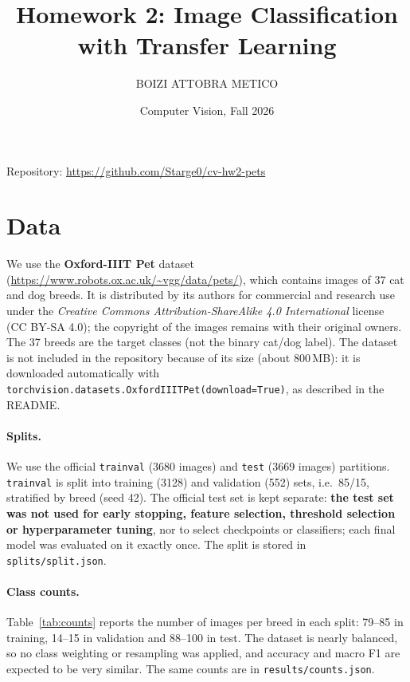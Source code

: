 \documentclass[11pt,a4paper]{article}
\title{Homework 2: Image Classification with Transfer Learning}
\author{BOIZI ATTOBRA METICO}
\date{Computer Vision, Fall 2026}
\begin{document}
\maketitle

Repository: \url{https://github.com/Starge0/cv-hw2-pets}

\section{Data}

We use the \textbf{Oxford-IIIT Pet} dataset \cite{parkhi2012}
(\url{https://www.robots.ox.ac.uk/~vgg/data/pets/}), which contains images of 37 cat and dog
breeds. It is distributed by its authors for commercial and research use under the
\emph{Creative Commons Attribution-ShareAlike 4.0 International} license (CC BY-SA 4.0); the
copyright of the images remains with their original owners. The 37 breeds are the target
classes (not the binary cat/dog label). The dataset is not included in the repository because
of its size (about 800\,MB): it is downloaded automatically with
\texttt{torchvision.datasets.OxfordIIITPet(download=True)}, as described in the README.

\paragraph{Splits.} We use the official \texttt{trainval} (3680 images) and \texttt{test}
(3669 images) partitions. \texttt{trainval} is split into training (3128) and validation (552)
sets, i.e.\ 85/15, stratified by breed (seed 42). The official test set is kept separate:
\textbf{the test set was not used for early stopping, feature selection, threshold selection
or hyperparameter tuning}, nor to select checkpoints or classifiers; each final model was
evaluated on it exactly once. The split is stored in \texttt{splits/split.json}.

\paragraph{Class counts.} Table~\ref{tab:counts} reports the number of images per breed in each
split: 79--85 in training, 14--15 in validation and 88--100 in test. The dataset is nearly
balanced, so no class weighting or resampling was applied, and accuracy and macro F1 are
expected to be very similar. The same counts are in \texttt{results/counts.json}.


\end{document}
